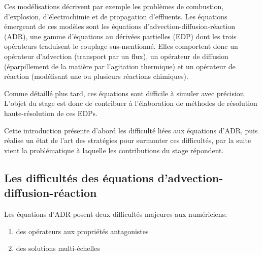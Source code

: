 Ces modélisations décrivent par exemple les problèmes de combustion, d'explosion, d'électrochimie et de propagation d'effluents.
Les équations émergeant de ces modèles sont les équations d'advection-diffusion-réaction (ADR), 
une gamme d'équations au dérivées partielles (EDP) dont les trois opérateurs traduisent le couplage sus-mentionné.
Elles comportent donc un opérateur d'advection (transport par un flux), un opérateur de diffusion (éparpillement de la matière par l'agitation thermique) 
et un opérateur de réaction (modélisant une ou plusieurs réactions chimiques).\par 
Comme détaillé plus tard, ces équations sont difficile à simuler avec précision. L'objet du stage est donc de contribuer à l'élaboration
de méthodes de résolution haute-résolution de ces EDPs.\par 
Cette introduction présente d'abord les difficulté liées aux équations d'ADR, puis réalise un état de l'art des stratégies pour surmonter ces difficultés,
par la suite vient la problématique à laquelle les contributions du stage répondent.

\subsection{Les difficultés des équations d'advection-diffusion-réaction}
    Les équations d'ADR posent deux difficultés majeures aux numériciens:
    \begin{enumerate}[label=\Alph*.]
        \item des opérateurs aux propriétés antagonistes
        \item des solutions multi-échelles
    \end{enumerate}
